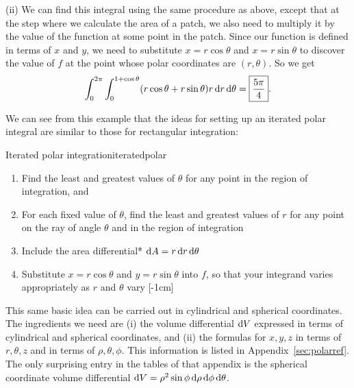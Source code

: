 \documentclass[svgnames]{watsonbook}
\begin{document}
\begin{solution}
              
    (ii) We can find this integral using the same procedure as above,
    except that at the step where we calculate the area of a patch, we
    also need to multiply it by the value of the function at some point
    in the patch. Since our function is defined in terms of $x$ and
    $y$, we need to substitute $x = r\cos \theta$ and $x = r\sin
    \theta$ to discover the value of $f$ at the point whose polar
    coordinates are $(r,\theta)$. So we get
    \[
      \int_0^{2\pi} \int_0^{1+\cos \theta} (r \cos\theta + r\sin
      \theta)r \, {\mathrm{d}}r \, \mathrm{d}\theta = \boxed{\frac{5\pi}{4}}. 
    \]
\end{solution}

We can see from this example that the ideas for setting up an iterated
polar integral are similar to those for 
rectangular integration:
\begin{obs}{Iterated polar integration}{iteratedpolar}
\begin{enumerate}[itemsep = 6pt, topsep = 5pt, leftmargin=12pt]
\item Find the least and greatest values of $\theta$ for any point in
  the region of integration, and 
\item For each fixed value of $\theta$, find the least and greatest
  values of $r$ for any point on the ray of angle $\theta$ and in the
  region of integration
\item Include the area differential* $\mathrm{d} A = r \, {\mathrm{d}}r \, \mathrm{d}\theta$
\item Substitute $x = r \cos\theta$ and $y=r\sin \theta$ into $f$, so
  that your integrand varies appropriately as $r$ and $\theta$ vary 
  [-1cm]
\end{enumerate}
\end{obs}

This same basic idea can be carried out in cylindrical and spherical
coordinates. The ingredients we need are (i) the volume differential
$\mathrm{d} V$ expressed in terms of cylindrical and spherical coordinates, and
(ii) the formulas for $x, y, z$ in terms of $r, \theta, z$ and in
terms of $\rho, \theta, \phi$. This information is listed in
Appendix~\ref{sec:polarref}. The only surprising entry in the tables
of that appendix is the spherical coordinate volume differential $\mathrm{d} V =
\rho^2 \sin \phi \, {\mathrm{d}}\rho \, {\mathrm{d}} \phi \, \mathrm{d}\theta$.
\end{document}
